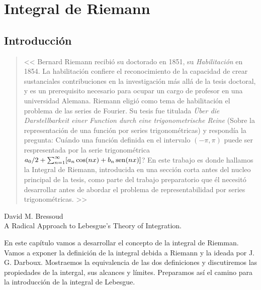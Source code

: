 \chapter{Integral de Riemann}

\section{Introducción}

\begin{quotation}
<< Bernard Riemann recibió su doctorado en 1851, su \emph{Habilitación} en 1854. La habilitación confiere el reconocimiento de la capacidad de crear sustanciales contribuciones en la investigación más allá de la tesis doctoral, y es un prerequisito necesario para ocupar un cargo de profesor en una universidad Alemana. Riemann eligió como tema  de habilitación el problema de las series de Fourier. Su tesis fue titulada \emph{\"Uber die Darstellbarkeit einer Function durch eine trigonometrische Reine} (Sobre la representación de una función por series trigonométricas) y respondía la pregunta:  Cuándo una función definida en el intervalo $(-\pi,\pi)$ puede ser respresentada por la serie trigonométrica $a_0/2+\sum_{n=1}^{\infty}[a_n\cos(nx)+b_n\operatorname{sen}(nx)]$? 
En este trabajo  es donde hallamos   la Integral de Riemann, introducida en una sección corta antes del nucleo principal de la tesis, como parte del trabajo preparatorio que él necesitó desarrollar antes de abordar el problema de representabilidad por series trigonométricas. >> 
\end{quotation}
\begin{flushright}
 David M. Bressoud\\
 A Radical Approach to Lebesgue's Theory of Integration.
\end{flushright}


En este capítulo vamos a desarrollar el concepto de la integral de Riemman. Vamos a exponer la definición de la integral debida a Riemann y la ideada por J. G. Darboux.
Mostraemos la equivalencia de las dos definiciones y discutiremos las propiedades de la intergal, sus alcances y límites. Preparamos así el camino para la introducción de la integral de Lebesgue. 

